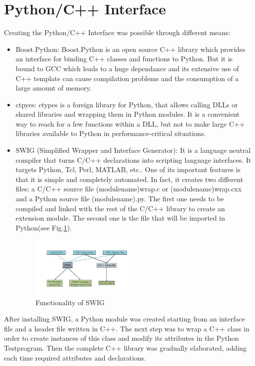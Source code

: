 \section{Python/C++ Interface}
Creating the Python/C++ Interface was possible through different means:\\
\begin{itemize}
\item Boost.Python: Boost.Python is an open source C++ library which provides an interface for binding C++ classes and functions to Python. But it is bound to GCC which leads to a huge dependance and its extensive use of C++ template can cause compilation problems and the consumption of a large amount of memory. \\
\item ctpyes: ctypes is a foreign library for Python, that allows calling DLLs or shared libraries and wrapping them in Python modules. It is a convenient way to reach for a few functions within a DLL, but not to make large C++ libraries available to Python in performance-critical situations.\\
\item SWIG (Simplified Wrapper and Interface Generator): It is a language neutral compiler that turns C/C++ declarations into scripting language interfaces. It targets Python, Tcl, Perl, MATLAB, etc.. One of its important features is that it is simple and completely automated. In fact, it creates two different files; a C/C++ source file (module\textunderscore name)\textunderscore wrap.c or (module\textunderscore name)\textunderscore wrap.cxx and a Python source file (module\textunderscore name).py. The first one needs to be compiled and linked with the rest of the C/C++ library to create an extension module. The second one is the file that will be imported in Python(see Fig.\ref{fig:swig}).\\
\begin{figure}[htb]
  \centering
  \includegraphics[width=0.5\textwidth]{figures/swig_func}
  \caption{Functionality of SWIG}
  \label{fig:swig}
\end{figure}
\end{itemize}
After installing SWIG, a Python module was created starting from an interface file and a header file written in C++. The next step was to wrap a C++ class in order to create instances of this class and modify its attributes in the Python Testprogram. Then the complete C++ library was gradually elaborated, adding each time required attributes and declarations.\\

